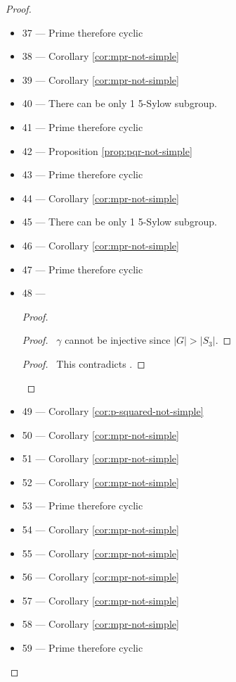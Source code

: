 \begin{proof}
\begin{itemize}
\begin{proof}
	\qedstep
	\begin{proof}
		\pf\ This contradicts .
	\end{proof}
\end{proof}
\item 37 --- Prime therefore cyclic
\item 38 --- Corollary \ref{cor:mpr-not-simple}
\item 39 --- Corollary \ref{cor:mpr-not-simple}
\item 40 --- There can be only 1 5-Sylow subgroup.
\item 41 --- Prime therefore cyclic
\item 42 --- Proposition \ref{prop:pqr-not-simple} 
\item 43 --- Prime therefore cyclic
\item 44 --- Corollary \ref{cor:mpr-not-simple}
\item 45 --- There can be only 1 5-Sylow subgroup.
\item 46 --- Corollary \ref{cor:mpr-not-simple}
\item 47 --- Prime therefore cyclic
\item 48 ---
\begin{proof}
	\begin{proof}
		\pf\ $\gamma$ cannot be injective since $|G| > |S_3|$.
	\end{proof}
	\qedstep
	\begin{proof}
		\pf\ This contradicts .
	\end{proof}
\end{proof}
\item 49 --- Corollary \ref{cor:p-squared-not-simple}
\item 50 --- Corollary \ref{cor:mpr-not-simple}
\item 51 --- Corollary \ref{cor:mpr-not-simple}
\item 52 --- Corollary \ref{cor:mpr-not-simple}
\item 53 --- Prime therefore cyclic
\item 54 --- Corollary \ref{cor:mpr-not-simple}
\item 55 --- Corollary \ref{cor:mpr-not-simple}
\item 56 --- Corollary \ref{cor:mpr-not-simple}
\item 57 --- Corollary \ref{cor:mpr-not-simple}
\item 58 --- Corollary \ref{cor:mpr-not-simple}
\item 59 --- Prime therefore cyclic
\end{itemize}
\end{proof}

